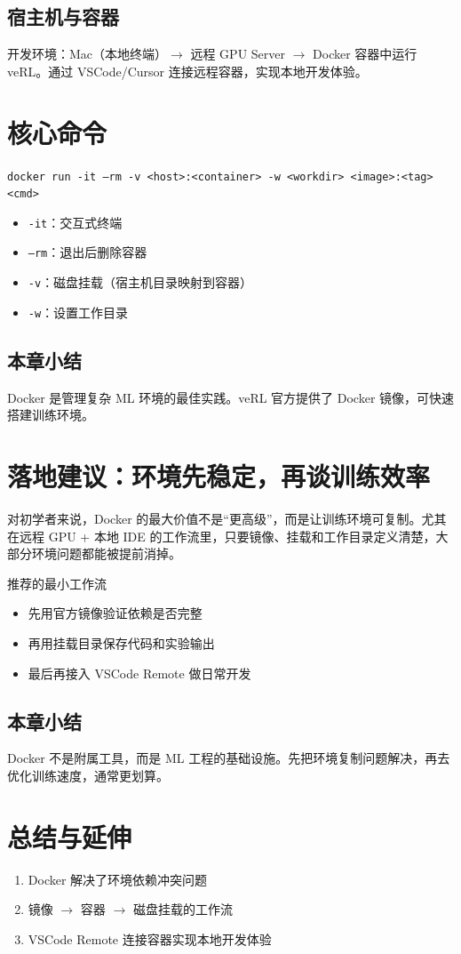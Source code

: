 \documentclass[a4paper]{article}
\begin{document}
\subsection{宿主机与容器}
开发环境：Mac（本地终端）$\to$ 远程 GPU Server $\to$ Docker 容器中运行 veRL。通过 VSCode/Cursor 连接远程容器，实现本地开发体验。

\section{核心命令}
\texttt{docker run -it --rm -v <host>:<container> -w <workdir> <image>:<tag> <cmd>}
\begin{itemize}
  \item \texttt{-it}：交互式终端
  \item \texttt{--rm}：退出后删除容器
  \item \texttt{-v}：磁盘挂载（宿主机目录映射到容器）
  \item \texttt{-w}：设置工作目录
\end{itemize}

\subsection{本章小结}
Docker 是管理复杂 ML 环境的最佳实践。veRL 官方提供了 Docker 镜像，可快速搭建训练环境。

\newpage
\section{落地建议：环境先稳定，再谈训练效率}
对初学者来说，Docker 的最大价值不是“更高级”，而是让训练环境可复制。尤其在远程 GPU + 本地 IDE 的工作流里，只要镜像、挂载和工作目录定义清楚，大部分环境问题都能被提前消掉。

\begin{knowledgebox}{推荐的最小工作流}
\begin{itemize}
  \item 先用官方镜像验证依赖是否完整
  \item 再用挂载目录保存代码和实验输出
  \item 最后再接入 VSCode Remote 做日常开发
\end{itemize}
\end{knowledgebox}

\subsection{本章小结}
Docker 不是附属工具，而是 ML 工程的基础设施。先把环境复制问题解决，再去优化训练速度，通常更划算。

\newpage
\section{总结与延伸}
\begin{enumerate}
  \item Docker 解决了环境依赖冲突问题
  \item 镜像 $\to$ 容器 $\to$ 磁盘挂载的工作流
  \item VSCode Remote 连接容器实现本地开发体验
\end{enumerate}
\end{document}
